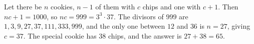Let there be $n$ cookies, $n-1$ of them with $c$ chips and one with $c+1$. Then $nc+1=1000$, so $nc=999=3^3\cdot37$. The divisors of $999$ are $1,3,9,27,37,111,333,999$, and the only one between $12$ and $36$ is $n=27$, giving $c=37$. The special cookie has $38$ chips, and the answer is $27+38=\boxed{65}$.
